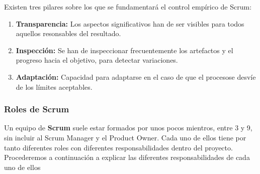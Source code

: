 \newpage
Existen tres pilares sobre los que se fundamentará el control empírico de Scrum:

\begin{enumerate}
	\item \textbf{Transparencia:} Los aspectos significativos han de ser visibles para todos aquellos resonsables del resultado.
	\item \textbf{Inspección:} Se han de inspeccionar frecuentemente los artefactos y el progreso hacia el objetivo, para detectar variaciones.
	\item \textbf{Adaptación:}  Capacidad para adaptarse en el caso de que el procesose desvíe de los límites aceptables.
\end{enumerate}

\subsubsection{Roles de Scrum}

Un equipo de \textbf{Scrum} suele estar formados por unos pocos mientros, entre 3 y 9, sin incluir al Scrum Manager y el Product Owner. Cada uno de ellos tiene por tanto diferentes roles con diferentes responsabilidades dentro del proyecto. Procederemos a continuación a explicar las diferentes responsabilidades de cada uno de ellos

